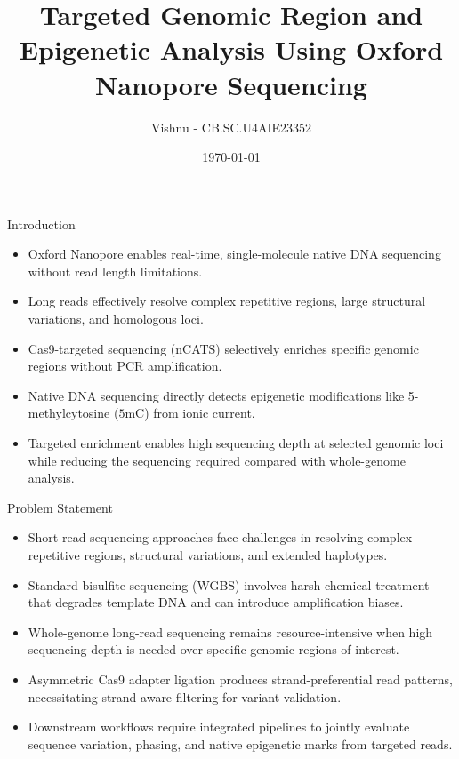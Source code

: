 \documentclass[aspectratio=169, 10pt]{beamer}
\title[Targeted Nanopore Epigenetic Analysis]{Targeted Genomic Region and Epigenetic Analysis Using Oxford Nanopore Sequencing}
\author[Group 17]{Vishnu - CB.SC.U4AIE23352}
\institute[DNA Sequencing Technologies]{Group Number: 17 \\[0.15cm] Course: DNA Sequencing Technologies}
\date{\today}
\begin{document}
\begin{frame}[plain]
    \titlepage
\end{frame}

\begin{frame}{Introduction}
    \vspace{0.4cm}
    \begin{itemize}
        \item Oxford Nanopore enables real-time, single-molecule native DNA sequencing without read length limitations.
        \item Long reads effectively resolve complex repetitive regions, large structural variations, and homologous loci.
        \item Cas9-targeted sequencing (nCATS) selectively enriches specific genomic regions without PCR amplification.
        \item Native DNA sequencing directly detects epigenetic modifications like 5-methylcytosine ($5\text{mC}$) from ionic current.
        \item Targeted enrichment enables high sequencing depth at selected genomic loci while reducing the sequencing required compared with whole-genome analysis.
    \end{itemize}
\end{frame}

\begin{frame}{Problem Statement}
    \vspace{0.4cm}
    \begin{itemize}
        \item Short-read sequencing approaches face challenges in resolving complex repetitive regions, structural variations, and extended haplotypes.
        \item Standard bisulfite sequencing (WGBS) involves harsh chemical treatment that degrades template DNA and can introduce amplification biases.
        \item Whole-genome long-read sequencing remains resource-intensive when high sequencing depth is needed over specific genomic regions of interest.
        \item Asymmetric Cas9 adapter ligation produces strand-preferential read patterns, necessitating strand-aware filtering for variant validation.
        \item Downstream workflows require integrated pipelines to jointly evaluate sequence variation, phasing, and native epigenetic marks from targeted reads.
    \end{itemize}
\end{frame}
\end{document}
